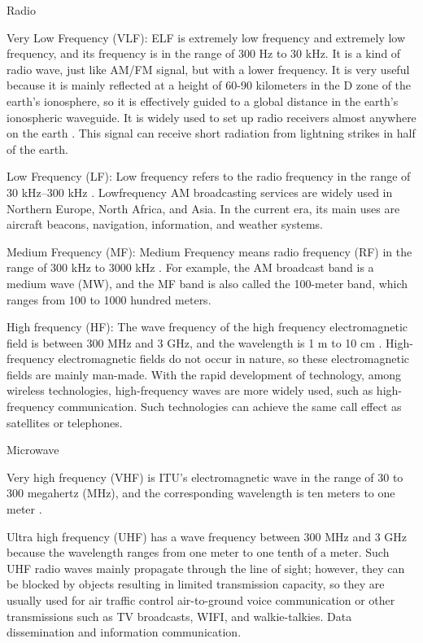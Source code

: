 \documentclass[conference]{IEEEtran}
\newcommand{\subparagraph}{}
\begin{document}
\subparagraph{Radio}
    
Very Low Frequency (VLF): ELF is extremely low frequency and extremely low frequency, and its frequency is in the range of 
300 Hz to 30 kHz. It is a kind of radio wave, just like AM/FM signal, but with a lower frequency. It is very useful because 
it is mainly reflected at a height of 60-90 kilometers in the D zone of the earth's ionosphere, so it is effectively guided 
to a global distance in the earth's ionospheric waveguide. It is widely used to set up radio receivers almost anywhere on 
the earth \cite{Introduc19:online}. This signal can receive short radiation from lightning strikes in half of the earth.
    
Low Frequency (LF): Low frequency refers to the radio frequency in the range of 30 kHz–300 kHz \cite{httpswww63:online}. Low\-frequency AM broadcasting services are widely used in Northern Europe, North Africa, and Asia. In the current era, its main uses are aircraft beacons, navigation, information, and weather systems. 
    
Medium Frequency (MF): Medium Frequency means radio frequency (RF) in the range of 300 kHz to 3000 kHz \cite{httpswww49:online}. For example, 
the AM broadcast band is a medium wave (MW), and the MF band is also called the 100-meter band, which ranges from 100 
to 1000 hundred meters.
    
High frequency (HF): The wave frequency of the high frequency electromagnetic field is between 300 MHz and 3 GHz, and the wavelength is 1 m to 10 cm \cite{Highfreq56:online}. High-frequency electromagnetic fields do not occur in nature, so these electromagnetic fields are mainly man-made. With the rapid development of technology, among wireless technologies, high-frequency waves are more widely used, such as high-frequency communication. Such technologies can achieve the same call effect as satellites or telephones\cite{WhatisHi8:online}.

\subparagraph{Microwave}
    
Very high frequency (VHF) is ITU's electromagnetic wave in the range of 30 to 300 megahertz (MHz), and the corresponding 
wavelength is ten meters to one meter \cite{Veryhigh48:online}.
    
Ultra high frequency (UHF) has a wave frequency between 300 MHz and 3 GHz because the wavelength ranges from one meter to one tenth of a meter\cite{Ultrahig37:online}. Such UHF radio waves mainly propagate through the line of sight; however, they can be blocked by objects resulting in limited transmission capacity, so they are usually used for air traffic control air-to-ground voice communication or other transmissions such as TV broadcasts, WIFI, and walkie-talkies. Data dissemination and information communication\cite{UltraHig10:online}.
    
\end{document}
